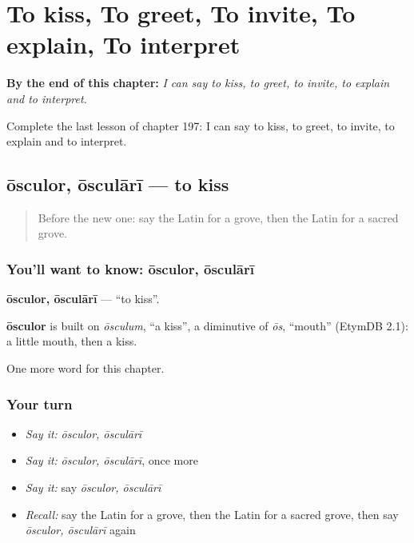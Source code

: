 
\chapter{To kiss, To greet, To invite, To explain, To interpret}
\label{ch:la-to-kiss-to-greet-to-invite-to-explain-to-interpret}

\begin{chapteropening}
\textbf{By the end of this chapter:} \emph{I can say to kiss, to greet, to invite, to explain and to interpret.}

Complete the last lesson of chapter 197: I can say to kiss, to greet, to invite, to explain and to interpret.
\end{chapteropening}

\section[ōsculor, ōsculārī]{ōsculor, ōsculārī — to kiss}

\label{lesson:LA-C197-osculor}



\begin{quote}
Before the new one: say the Latin for a grove, then the Latin for a sacred grove.
\end{quote}

\subsection*{You'll want to know: ōsculor, ōsculārī}
\textbf{ōsculor, ōsculārī} — \textquotedblleft{}to kiss\textquotedblright{}.

\begin{cousinweb}
\textbf{ōsculor} is built on \emph{ōsculum}, \textquotedblleft{}a kiss\textquotedblright{}, a diminutive of \emph{ōs}, \textquotedblleft{}mouth\textquotedblright{} (EtymDB 2.1): a little mouth, then a kiss.
\end{cousinweb}

\begin{grammarlens}[title={What you've built}]
One more word for this chapter.
\end{grammarlens}

\subsection*{Your turn}
\begin{itemize}
\raggedright
  \item \emph{Say it:} \emph{ōsculor, ōsculārī}
  \item \emph{Say it:} \emph{ōsculor, ōsculārī}, once more
  \item \emph{Say it:} say \emph{ōsculor, ōsculārī}
  \item \emph{Recall:} say the Latin for a grove, then the Latin for a sacred grove, then say \emph{ōsculor, ōsculārī} again
\end{itemize}

